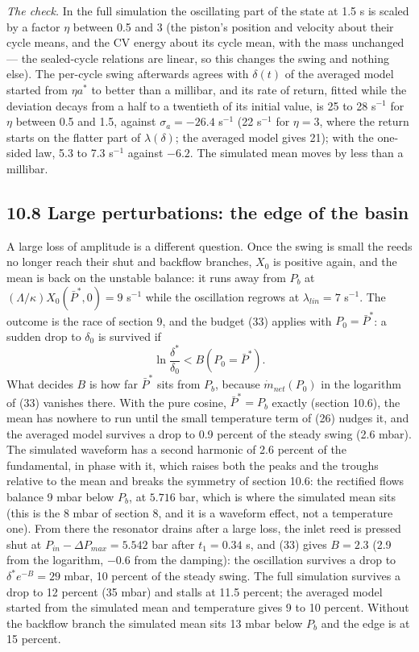 \documentclass[11pt]{article}
\begin{document}
\emph{The check.} In the full simulation the oscillating part of the state at 1.5 s is scaled by a factor $\eta$ between 0.5 and 3 (the piston's position and velocity about their cycle means, and the CV energy about its cycle mean, with the mass unchanged --- the sealed-cycle relations are linear, so this changes the swing and nothing else). The per-cycle swing afterwards agrees with $\delta(t)$ of the averaged model started from $\eta a^*$ to better than a millibar, and its rate of return, fitted while the deviation decays from a half to a twentieth of its initial value, is 25 to 28 s$^{-1}$ for $\eta$ between 0.5 and 1.5, against $\sigma_a = -26.4$ s$^{-1}$ (22 s$^{-1}$ for $\eta = 3$, where the return starts on the flatter part of $\lambda(\delta)$; the averaged model gives 21); with the one-sided law, 5.3 to 7.3 s$^{-1}$ against $-6.2$. The simulated mean moves by less than a millibar.

\subsection*{10.8 Large perturbations: the edge of the basin}

A large loss of amplitude is a different question. Once the swing is small the reeds no longer reach their shut and backflow branches, $X_0$ is positive again, and the mean is back on the unstable balance: it runs away from $P_b$ at $(\Lambda/\kappa)X_0(\bar P^*, 0) = 9$ s$^{-1}$ while the oscillation regrows at $\lambda_{lin} = 7$ s$^{-1}$. The outcome is the race of section 9, and the budget (33) applies with $P_0 = \bar P^*$: a sudden drop to $\delta_0$ is survived if
\begin{equation}
\ln\frac{\delta^*}{\delta_0} < B(P_0 = \bar P^*) . \tag{44}
\end{equation}
What decides $B$ is how far $\bar P^*$ sits from $P_b$, because $\dot m_{net}(P_0)$ in the logarithm of (33) vanishes there. With the pure cosine, $\bar P^* = P_b$ exactly (section 10.6), the mean has nowhere to run until the small temperature term of (26) nudges it, and the averaged model survives a drop to 0.9 percent of the steady swing (2.6 mbar). The simulated waveform has a second harmonic of 2.6 percent of the fundamental, in phase with it, which raises both the peaks and the troughs relative to the mean and breaks the symmetry of section 10.6: the rectified flows balance 9 mbar below $P_b$, at $5.716$ bar, which is where the simulated mean sits (this is the 8 mbar of section 8, and it is a waveform effect, not a temperature one). From there the resonator drains after a large loss, the inlet reed is pressed shut at $P_{in} - \Delta P_{max} = 5.542$ bar after $t_1 = 0.34$ s, and (33) gives $B = 2.3$ (2.9 from the logarithm, $-0.6$ from the damping): the oscillation survives a drop to $\delta^*e^{-B} = 29$ mbar, 10 percent of the steady swing. The full simulation survives a drop to 12 percent (35 mbar) and stalls at 11.5 percent; the averaged model started from the simulated mean and temperature gives 9 to 10 percent. Without the backflow branch the simulated mean sits 13 mbar below $P_b$ and the edge is at 15 percent.
\end{document}
